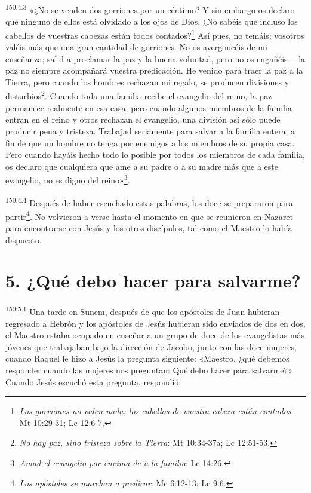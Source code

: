 \par
\textsuperscript{150:4.3} «¿No se venden dos gorriones por un céntimo? Y sin embargo os declaro que ninguno de ellos está olvidado a los ojos de Dios. ¿No sabéis que incluso los cabellos de vuestras cabezas están todos contados?\footnote{\textit{Los gorriones no valen nada; los cabellos de vuestra cabeza están contados}: Mt 10:29-31; Lc 12:6-7.} Así pues, no temáis; vosotros valéis más que una gran cantidad de gorriones. No os avergoncéis de mi enseñanza; salid a proclamar la paz y la buena voluntad, pero no os engañéis ---la paz no siempre acompañará vuestra predicación. He venido para traer la paz a la Tierra, pero cuando los hombres rechazan mi regalo, se producen divisiones y disturbios\footnote{\textit{No hay paz, sino tristeza sobre la Tierra}: Mt 10:34-37a; Lc 12:51-53.}. Cuando toda una familia recibe el evangelio del reino, la paz permanece realmente en esa casa; pero cuando algunos miembros de la familia entran en el reino y otros rechazan el evangelio, una división así sólo puede producir pena y tristeza. Trabajad seriamente para salvar a la familia entera, a fin de que un hombre no tenga por enemigos a los miembros de su propia casa. Pero cuando hayáis hecho todo lo posible por todos los miembros de cada familia, os declaro que cualquiera que ame a su padre o a su madre más que a este evangelio, no es digno del reino»\footnote{\textit{Amad el evangelio por encima de a la familia}: Lc 14:26.}.

\par
\textsuperscript{150:4.4} Después de haber escuchado estas palabras, los doce se prepararon para partir\footnote{\textit{Los apóstoles se marchan a predicar}: Mc 6:12-13; Lc 9:6.}. No volvieron a verse hasta el momento en que se reunieron en Nazaret para encontrarse con Jesús y los otros discípulos, tal como el Maestro lo había dispuesto.

\section*{5. ¿Qué debo hacer para salvarme?}
\par
\textsuperscript{150:5.1} Una tarde en Sunem, después de que los apóstoles de Juan hubieran regresado a Hebrón y los apóstoles de Jesús hubieran sido enviados de dos en dos, el Maestro estaba ocupado en enseñar a un grupo de doce de los evangelistas más jóvenes que trabajaban bajo la dirección de Jacobo, junto con las doce mujeres, cuando Raquel le hizo a Jesús la pregunta siguiente: «Maestro, ¿qué debemos responder cuando las mujeres nos preguntan: Qué debo hacer para salvarme?» Cuando Jesús escuchó esta pregunta, respondió:

